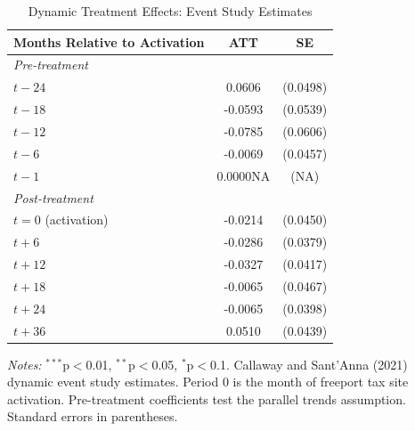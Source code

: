 \begin{table}[htbp]
\centering
\caption{Dynamic Treatment Effects: Event Study Estimates}
\label{tab:eventstudy}
\begin{tabular}{lcc}
\hline\hline
Months Relative to Activation & ATT & SE \\
\hline
\textit{Pre-treatment} & & \\
$t -24$ & 0.0606 & (0.0498) \\
$t -18$ & -0.0593 & (0.0539) \\
$t -12$ & -0.0785 & (0.0606) \\
$t -6$ & -0.0069 & (0.0457) \\
$t -1$ & 0.0000NA & (NA) \\
\hline
\textit{Post-treatment} & & \\
$t = 0$ (activation) & -0.0214 & (0.0450) \\
$t + 6$ & -0.0286 & (0.0379) \\
$t + 12$ & -0.0327 & (0.0417) \\
$t + 18$ & -0.0065 & (0.0467) \\
$t + 24$ & -0.0065 & (0.0398) \\
$t + 36$ & 0.0510 & (0.0439) \\
\hline\hline
\end{tabular}
\begin{tablenotes}[flushleft]
\small
\item \textit{Notes:} $^{***}$p$<$0.01, $^{**}$p$<$0.05, $^{*}$p$<$0.1. Callaway and Sant'Anna (2021) dynamic event study estimates. Period 0 is the month of freeport tax site activation. Pre-treatment coefficients test the parallel trends assumption. Standard errors in parentheses.
\end{tablenotes}
\end{table}
